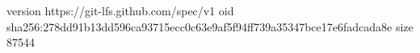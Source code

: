 version https://git-lfs.github.com/spec/v1
oid sha256:278dd91b13dd596ca93715ecc0c63e9af5f94ff739a35347bce17e6fadcada8e
size 87544

